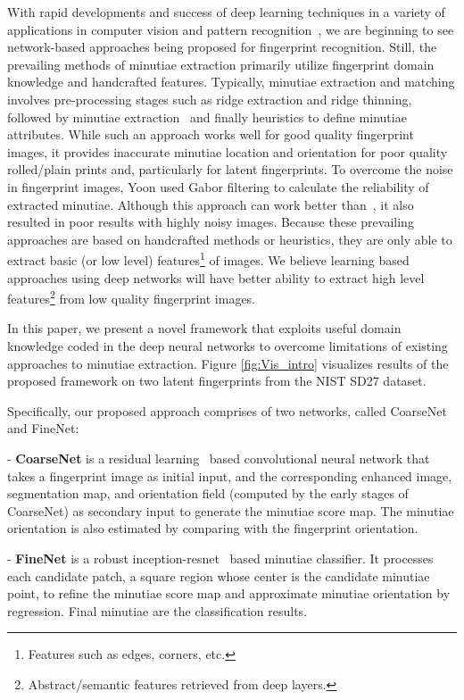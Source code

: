 \documentclass[10pt,twocolumn,letterpaper]{article}
\begin{document}
With rapid developments and success of deep learning techniques in a variety of applications in computer vision and pattern recognition~\cite{he2016deep, szegedy2017inception}, we are beginning to see network-based approaches being proposed for fingerprint recognition. Still, the prevailing methods of minutiae extraction primarily utilize fingerprint domain knowledge and handcrafted features. Typically, minutiae extraction and matching involves pre-processing stages such as ridge extraction and ridge thinning, followed by minutiae extraction~\cite{jain1997line, feng2008combining} and finally heuristics to define minutiae attributes. While such an approach works well for good quality fingerprint images, it provides inaccurate minutiae location and orientation for poor quality rolled/plain prints and, particularly for latent fingerprints. To overcome the noise in fingerprint images, Yoon \etal\cite{yoon2011latent} used Gabor filtering to calculate the reliability of extracted minutiae. Although this approach can work better than~\cite{jain1997line}, it also resulted in poor results with highly noisy images. Because these prevailing approaches are based on handcrafted methods or heuristics, they are only able to extract basic (or low level) features\footnote{Features such as edges, corners, etc.} of images. We believe learning based approaches using deep networks will have better ability to extract high level features\footnote{Abstract/semantic features retrieved from deep layers.} from low quality fingerprint images.

In this paper, we present a novel framework that exploits useful domain knowledge coded in the deep neural networks to overcome limitations of existing approaches to minutiae extraction. Figure \ref{fig:Vis_intro} visualizes results of the proposed framework on two latent fingerprints from the NIST SD27 dataset. 

Specifically, our proposed approach comprises of two networks, called CoarseNet and FineNet:

- \textbf{CoarseNet} is a residual learning~\cite{he2016deep} based convolutional neural network that takes a fingerprint image as initial input, and the corresponding enhanced image, segmentation map, and orientation field (computed by the early stages of CoarseNet) as secondary input to generate the minutiae score map. The minutiae orientation is also estimated by comparing with the fingerprint orientation.

- \textbf{FineNet} is a robust inception-resnet~\cite{szegedy2017inception} based minutiae classifier. It processes each candidate patch, a square region whose center is the candidate minutiae point, to refine the minutiae score map and approximate minutiae orientation by regression. Final minutiae are the classification results.
\end{document}
